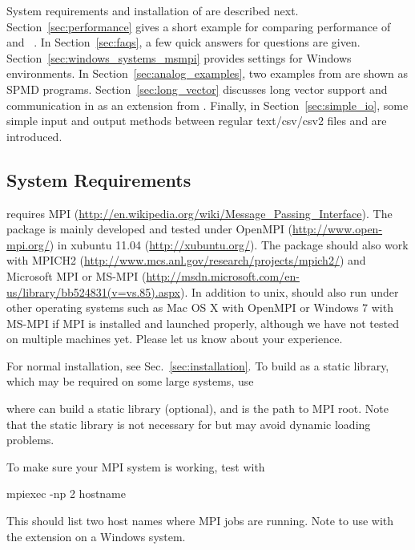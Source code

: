 System requirements and installation of  are described
next.  Section~\ref{sec:performance} gives a short example for
comparing performance of  and ~\citep{Yu2002}.
In Section~\ref{sec:faqs}, a few quick answers for questions are
given.  Section~\ref{sec:windows_systems_msmpi} provides settings for
Windows environments.  In Section~\ref{sec:analog_examples},
two examples from  are shown as SPMD 
programs. Section~\ref{sec:long_vector} discusses long vector support
and communication in  as an extension from .
Finally, in Section~\ref{sec:simple_io}, some simple input and output
methods between regular text/csv/csv2 files and  are
introduced.


\subsection[System Requirements]{System Requirements}
\label{sec:system_requirements}

 requires MPI
(\url{http://en.wikipedia.org/wiki/Message_Passing_Interface}). The
package is mainly developed and tested under {\color{blue} OpenMPI}
(\url{http://www.open-mpi.org/}) in xubuntu 11.04
(\url{http://xubuntu.org/}). The package should also work with
MPICH2 (\url{http://www.mcs.anl.gov/research/projects/mpich2/}) and
Microsoft MPI or MS-MPI
(\url{http://msdn.microsoft.com/en-us/library/bb524831(v=vs.85).aspx}).
In addition to unix,  should also run under other operating systems
such as Mac OS X with OpenMPI or Windows 7 with MS-MPI if MPI is
installed and launched properly, although we have not tested on
multiple machines yet.  Please let us know about your experience.

For normal installation, see Sec.~\ref{sec:installation}. To build as
a static library, which may be required on some large systems, use
where {\color{red} \code{-}} can build a static
library (optional), and  is the path to MPI root.
Note that the static library is not necessary for  but may
avoid dynamic loading problems.

To make sure your MPI system is working, test with
\begin{Command}
mpiexec -np 2 hostname
\end{Command}
This should list two host names where MPI jobs are running.  Note to
use  with the extension on a Windows system.



